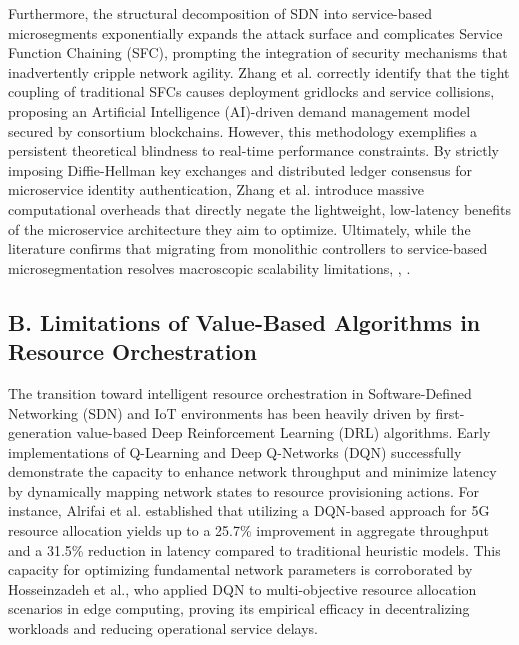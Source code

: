 Furthermore, the structural decomposition of SDN into service-based microsegments exponentially expands the attack surface and complicates Service Function Chaining (SFC), prompting the integration of security mechanisms that inadvertently cripple network agility. Zhang et al. correctly identify that the tight coupling of traditional SFCs causes deployment gridlocks and service collisions, proposing an Artificial Intelligence (AI)-driven demand management model secured by consortium blockchains\cite{b21}. However, this methodology exemplifies a persistent theoretical blindness to real-time performance constraints. By strictly imposing Diffie-Hellman key exchanges and distributed ledger consensus for microservice identity authentication, Zhang et al. introduce massive computational overheads that directly negate the lightweight, low-latency benefits of the microservice architecture they aim to optimize\cite{b38}. Ultimately, while the literature confirms that migrating from monolithic controllers to service-based microsegmentation resolves macroscopic scalability limitations\cite{b8}, \cite{b12}, \cite{b19}.

\subsection{B. Limitations of Value-Based Algorithms in Resource Orchestration}\label{b.-limitations-of-value-based-algorithms-in-resource-orchestration}

The transition toward intelligent resource orchestration in Software-Defined Networking (SDN) and IoT environments has been heavily driven by first-generation value-based Deep Reinforcement Learning (DRL) algorithms. Early implementations of Q-Learning and Deep Q-Networks (DQN) successfully demonstrate the capacity to enhance network throughput and minimize latency by dynamically mapping network states to resource provisioning actions. For instance, Alrifai et al. established that utilizing a DQN-based approach for 5G resource allocation yields up to a 25.7\% improvement in aggregate throughput and a 31.5\% reduction in latency compared to traditional heuristic models\cite{b14}. This capacity for optimizing fundamental network parameters is corroborated by Hosseinzadeh et al., who applied DQN to multi-objective resource allocation scenarios in edge computing, proving its empirical efficacy in decentralizing workloads and reducing operational service delays\cite{b15}.

